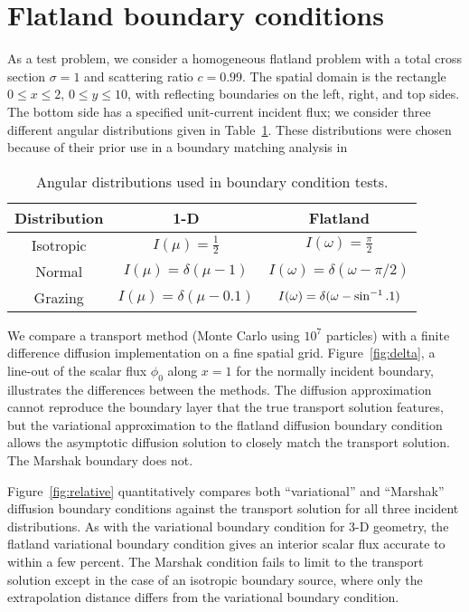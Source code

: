 \section{Flatland boundary conditions}

As a test problem, we consider a homogeneous flatland problem with a
total cross section $\sigma=1$ and scattering ratio $c=0.99$. The spatial 
domain is the rectangle $0 \le x \le 2$, $0 \le y \le 10$, with
reflecting boundaries on the left,
right, and top sides. The bottom side has a specified unit-current incident
flux; we consider three different angular
distributions given in Table~\ref{tab:angularDistributions}. These
distributions were chosen because of their prior use in a boundary
matching analysis in \cite{Dav2006}

\begin{table}[htb]
  \centering
  \begin{tabular}{ccc}
\toprule
    Distribution & 1-D & Flatland
\\ \midrule
Isotropic & $I(\mu) = \frac{1}{2}$ & $I(\omega) = \frac{\pi}{2}$
\\
Normal & $I(\mu) = \delta(\mu-1)$ & $I(\omega) = \delta(\omega-\pi/2)$
\\
Grazing & $I(\mu) = \delta(\mu-0.1)$ & $I(\omega) = \delta(\omega-\sin^{-1}.1)$
\\ \bottomrule
  \end{tabular}
  \caption{Angular distributions used in boundary condition tests.}
  \label{tab:angularDistributions}
\end{table}

We compare a transport method (Monte Carlo using $10^7$ particles)
with a finite difference diffusion implementation on a fine spatial grid.
Figure~\ref{fig:delta},
 a line-out of the scalar flux $\phi_0$ along
$x=1$ for the normally incident boundary, illustrates the differences between
the methods. The diffusion
approximation cannot reproduce the boundary layer that the true transport
solution features, but the variational approximation to the flatland
diffusion boundary condition allows the asymptotic diffusion solution to
closely match the transport solution. The Marshak boundary does not.

Figure~\ref{fig:relative} quantitatively compares both ``variational'' and
``Marshak'' diffusion boundary conditions against the transport solution
for all three incident distributions.  
As with the variational boundary condition for 3-D geometry, the flatland
variational boundary condition gives an interior scalar flux accurate to within
a few percent. The Marshak condition fails to limit to the transport solution except in
the case of an isotropic boundary source, where only the extrapolation
distance differs from the variational boundary condition.

